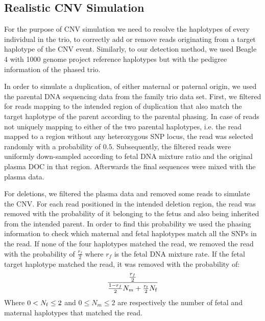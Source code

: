 \subsection{Realistic CNV Simulation}\label{ss:simulation}
For the purpose of CNV simulation we need to resolve the haplotypes of every individual in the trio, to correctly add or remove reads originating from a target haplotype of the CNV event. Similarly, to our detection method, we used Beagle 4 with 1000 genome project reference haplotypes but with the pedigree information of the phased trio.

	In order to simulate a duplication, of either maternal or paternal origin, we used the parental DNA sequencing data from the family trio data set. First, we filtered for reads mapping to the intended region of duplication that also match the target haplotype of the parent according to the parental phasing. In case of reads not uniquely mapping to either of the two parental haplotypes, i.e. the read mapped to a region without any heterozygous SNP locus, the read was selected randomly with a probability of $0.5$. Subsequently, the filtered reads were uniformly down-sampled according to fetal DNA mixture ratio and the original plasma DOC in that region. Afterwards the final sequences were mixed with the plasma data.
	
	For deletions, we filtered the plasma data and removed some reads to simulate the CNV. For each read positioned in the intended deletion region, the read was removed with the probability of it belonging to the fetus and also being inherited from the intended parent. In order to find this probability we used the phasing information to check which maternal and fetal haplotypes match all the SNPs in the read. If none of the four haplotypes matched the read, we removed the read with the probability of $\frac{r_f}{2}$ where $r_f$ is the fetal DNA mixture rate. If the fetal target haplotype matched the read, it was removed with the probability of:
	$$\frac{ \frac{r_f}{2} } { \frac{1-r_f}{2} N_m + \frac{r_{\mathrm{f}}}{2} N_{\mathrm{f}}}$$
	Where $0 < N_{\mathrm{f}} \leq 2$ and $0 \leq N_m \leq 2$ are respectively the number of fetal and maternal haplotypes that matched the read.
	
